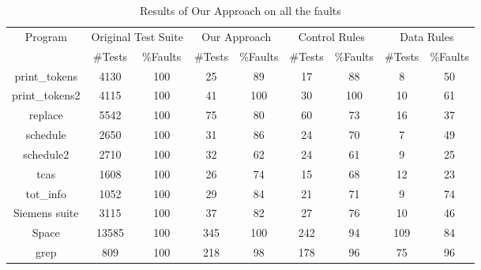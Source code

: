 \documentclass{sig-alternate}
\begin{document}
\begin{table}[htbp]
\caption{Results of Our Approach on all the faults}\label{tab:our}
\center
\begin{tabular}{|c|c|c|c|c|c|c|c|c|}
\hline Program   & \multicolumn{2}{c}{Original Test Suite} \vline & \multicolumn{2}{c}{Our Approach} \vline
& \multicolumn{2}{c}{Control Rules} \vline & \multicolumn{2}{c}{Data Rules} \vline   \\

\cline{2-9}   & \#Tests &   \%Faults & \#Tests &   \%Faults &
\#Tests &   \%Faults & \#Tests &   \%Faults \\
\hline  print\_tokens   &   4130    &   100 &   25  &   89  &   17  &   88  &   8   &   50  \\
\hline  print\_tokens2  &   4115    &   100 &   41  &   100 &   30  &   100 &   10  &   61  \\
\hline  replace &   5542    &   100 &   75  &   80  &   60  &   73  &   16  &   37  \\
\hline  schedule    &   2650    &   100 &   31  &   86  &   24  &   70  &   7   &   49  \\
\hline  schedule2   &   2710    &   100 &   32  &   62  &   24  &   61  &   9   &   25  \\
\hline  tcas    &   1608    &   100 &   26  &   74  &   15  &   68  &   12  &   23  \\
\hline  tot\_info &   1052    &   100 &   29  &   84  &   21  &   71  &   9   &   74  \\
\hline  Siemens suite   &   3115    &   100 &   37  &   82  &   27  &   76  &   10  &   46  \\
\hline  Space   &   13585   &   100 &   345 &   100 &   242 &   94  &   109 &   84  \\
\hline  grep    &   809 &   100 &   218 &   98  &   178 &   96  &   75  &   96  \\

\hline
\end{tabular}
\end{table}
\end{document}
